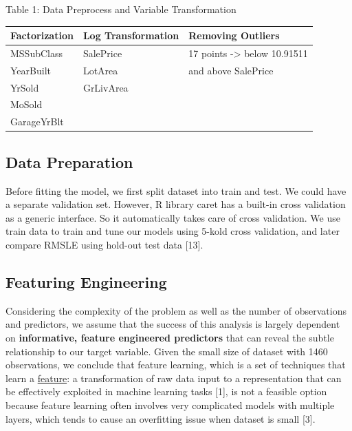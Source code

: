 \documentclass[a4paper]{article}
\begin{document}
\begin{flushleft}
Table 1: Data Preprocess and Variable Transformation

\vspace{2mm}
\begin{center}
\begin{tabular}{ | p{4.5cm} | p{4.5cm} | p{4.5cm} |}
  \hline			
  Factorization & Log Transformation & Removing Outliers\\
  \hline  
  MSSubClass & SalePrice & 17 points -> below 10.91511 \\
  YearBuilt & LotArea & and above SalePrice \\
  YrSold & GrLivArea & \\ 
  MoSold & & \\
  GarageYrBlt & & \\
  \hline  
\end{tabular}
\end{center}


\subsection{Data Preparation}
Before fitting the model, we first split dataset into train and test. We could have a separate validation set. However,  R library caret has a built-in cross validation as a generic interface. So it automatically takes care of cross validation. We use train data to train and tune our models using 5-kold cross validation, and later compare RMSLE using hold-out test data [13]. \newline

\subsection{Featuring Engineering}

Considering the complexity of the problem as well as the number of observations and predictors, we assume that the success of this analysis is largely dependent on \textbf{informative, feature engineered predictors} that can reveal the subtle relationship to our target variable. Given the small size of dataset with 1460 observations, we conclude that feature learning, which is a set of techniques that learn a \href{https://en.wikipedia.org/wiki/Feature_(machine_learning)}{feature}: a transformation of raw data input to a representation that can be effectively exploited in machine learning tasks [1], is not a feasible option because feature learning often involves very complicated models with multiple layers, which tends to cause an overfitting issue when dataset is small [3]. \newline


\end{flushleft}
\end{document}
